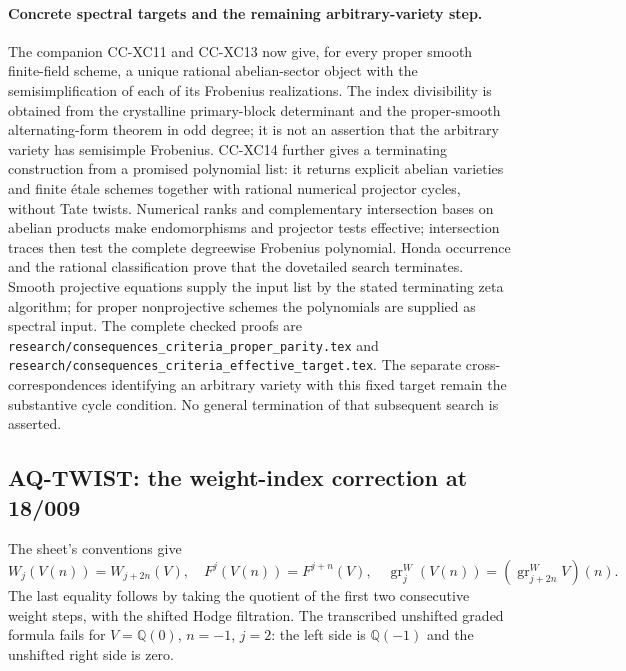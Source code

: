\paragraph{Concrete spectral targets and the remaining arbitrary-variety step.}
The companion CC-XC11 and CC-XC13 now give, for every proper
smooth finite-field scheme, a unique rational abelian-sector
object with the semisimplification of each of its Frobenius
realizations. The index divisibility is obtained from the
crystalline primary-block determinant and the proper-smooth
alternating-form theorem in odd degree; it is not an assertion
that the arbitrary variety has semisimple Frobenius.
CC-XC14 further gives a terminating construction from a promised
polynomial list: it returns explicit abelian varieties and
finite \'etale schemes together with rational numerical
projector cycles, without Tate twists. Numerical ranks and
complementary intersection bases on abelian products make
endomorphisms and projector tests effective; intersection traces
then test the complete degreewise Frobenius polynomial.
Honda occurrence and the rational classification prove that the
dovetailed search terminates. Smooth projective equations
supply the input list by the stated terminating zeta algorithm;
for proper nonprojective schemes the polynomials are supplied
as spectral input. The complete checked proofs are
\texttt{research/consequences\_criteria\_proper\_parity.tex}
and \texttt{research/consequences\_criteria\_effective\_target.tex}.
The separate cross-correspondences identifying an arbitrary
variety with this fixed target remain the substantive cycle
condition. No general termination of that subsequent search is
asserted.

\subsection{AQ-TWIST: the weight-index correction at 18/009}
The sheet's conventions give
\[
 W_j(V(n))=W_{j+2n}(V),\quad F^j(V(n))=F^{j+n}(V),\quad
 \operatorname{gr}^W_j(V(n))
 =(\operatorname{gr}^W_{j+2n}V)(n).                             \tag{AQ.6}
\]
The last equality follows by taking the quotient of the
first two consecutive weight steps, with the shifted Hodge
filtration. The transcribed unshifted graded formula fails
for $V=\mathbb Q(0)$, $n=-1$, $j=2$: the left side is
$\mathbb Q(-1)$ and the unshifted right side is zero.

